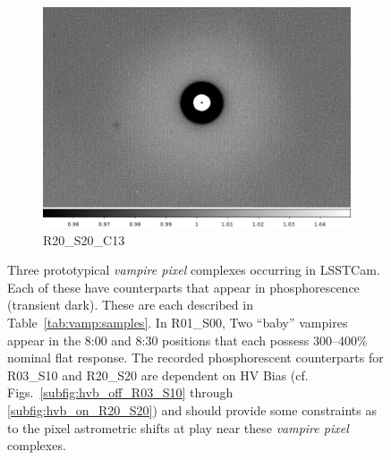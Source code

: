 \begin{figure}[!htbp]
\begin{subfigure}{0.3\textwidth}
     \includegraphics[width=\textwidth]{figures/vamp_desc/vamp_desc_ffresp_R20S20.png} 
     \caption{R20\_S20\_C13}
     \label{subfig:vamp_desc_R20_S20}
 \end{subfigure}  
 \newline
\caption{Three prototypical {\it vampire pixel} complexes occurring in LSSTCam. Each of these have counterparts that appear in phosphorescence (transient dark). These are each described in Table~\ref{tab:vamp:samples}. In R01\_S00, Two ``baby'' vampires appear in the 8:00 and 8:30 positions that each possess 300--400\% nominal flat response. The recorded phosphorescent counterparts for R03\_S10 and R20\_S20 are dependent on HV Bias (cf. Figs.~\ref{subfig:hvb_off_R03_S10} through \ref{subfig:hvb_on_R20_S20}) and should provide some constraints as to the pixel astrometric shifts at play near these {\it vampire pixel} complexes.}
\label{fig:vamp:ffresp}
\end{figure}




